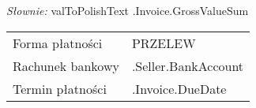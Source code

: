 \documentclass[12pt]{article}
\begin{document}
\vspace{1cm}

\begin{small}
    \textit{Słownie:} {{ valToPolishText .Invoice.GrossValueSum }} \\
\end{small}


\vspace{1cm}

\begin{tabular}{p{} l}
    Forma płatności & PRZELEW \\
    Rachunek bankowy & {{ .Seller.BankAccount }} \\
    Termin płatności & {{ .Invoice.DueDate }} \\
\end{tabular}
\end{document}
